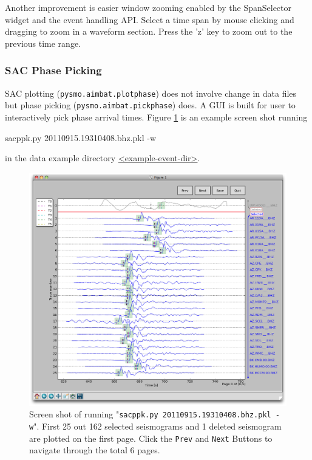 \documentclass[12pt, titlepage]{article}
\newenvironment{lyxcode}
{\begin{list}{}{
\setlength{\rightmargin}{\leftmargin}
\setlength{\listparindent}{0pt}%
\raggedright
\setlength{\itemsep}{0pt}
\setlength{\parsep}{0pt}
\normalfont\ttfamily}%
 \item[]}
{\end{list}}
\begin{document}
Another improvement is easier window zooming enabled by the SpanSelector widget and the event handling API.
Select a time span by mouse clicking and dragging to zoom in a waveform section.
Press the 'z' key to zoom out to the previous time range.





\subsubsection{SAC Phase Picking}

SAC plotting (\texttt{pysmo.aimbat.plotphase}) does not involve change in data files but phase picking (\texttt{pysmo.aimbat.pickphase}) does.
A GUI is built for user to interactively pick phase arrival times. 
Figure \ref{fig:sacppk} is an example screen shot running

\begin{lyxcode}
sacppk.py 20110915.19310408.bhz.pkl -w
\end{lyxcode}

in the data example directory \url{<example-event-dir>}.


\begin{figure}[!hb]
    \centering
    \includegraphics[width = 0.94 \textwidth]{figs/sacppk.png}
    \caption{Screen shot of running "\texttt{sacppk.py 20110915.19310408.bhz.pkl -w}". 
    First 25 out 162 selected seismograms and 1 deleted seismogram are plotted on the first page. 
    Click the \texttt{Prev} and \texttt{Next} Buttons to navigate through the total 6 pages. 
    }
    \label{fig:sacppk}
\end{figure}
\end{document}

